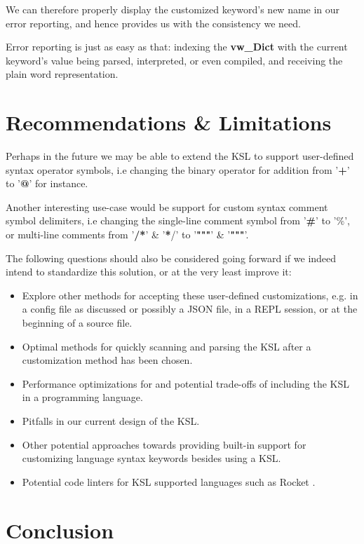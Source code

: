 \documentclass{article}
\begin{document}
We can therefore properly display the customized keyword's new name in our error reporting, and hence provides us with the consistency we need.

Error reporting is just as easy as that: indexing the \textbf{vw\_Dict} with the current keyword's value being parsed, interpreted, or even compiled, and receiving the plain word representation.

\section*{Recommendations \& Limitations}

Perhaps in the future we may be able to extend the KSL to support user-defined syntax operator symbols, i.e changing the binary operator for addition from '\textbf{+}' to '\textbf{@}' for instance.
  
Another interesting use-case would be support for custom syntax comment symbol delimiters, i.e changing the single-line comment symbol from '\textbf{\#}' to '\textbf{$\%$}', or multi-line comments from '\textbf{/*}' \& '\textbf{*}/' to '\textbf{"""}' \& '\textbf{"""}'.
  
The following questions should also be considered going forward if we indeed intend to standardize this solution, or at the very least improve it:
  
\begin{itemize}
    \item Explore other methods for accepting these user-defined customizations, e.g. in a config file as discussed or possibly a JSON file, in a REPL session, or at the beginning of a source file.
    \item Optimal methods for quickly scanning and parsing the KSL after a customization method has been chosen.
    \item Performance optimizations for and potential trade-offs of including the KSL in a programming language.
    \item Pitfalls in our current design of the KSL.
    \item Other potential approaches towards providing built-in support for customizing language syntax keywords besides using a KSL.
    \item Potential code linters for KSL supported languages such as Rocket \cite{Rocket}.
\end{itemize}
  
\section*{Conclusion}
  
\end{document}
